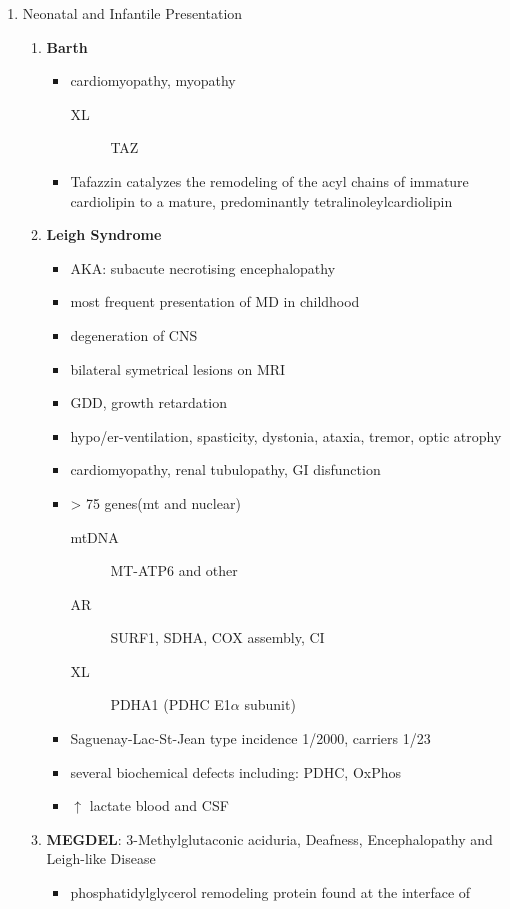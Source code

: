 \documentclass[12pt]{scrartcl}
\begin{document}
\begin{enumerate}
\item Neonatal and Infantile Presentation
\label{sec:orgbc77336}
\begin{enumerate}
\item \textbf{Barth}
\label{sec:org46046ce}
\begin{itemize}
\item cardiomyopathy, myopathy
\begin{description}
\item[{XL}] TAZ
\end{description}
\item Tafazzin catalyzes the remodeling of the acyl chains of immature
cardiolipin to a mature, predominantly tetralinoleylcardiolipin
\end{itemize}
\item \textbf{Leigh Syndrome}
\label{sec:org267f58e}
\begin{itemize}
\item AKA: subacute necrotising encephalopathy
\item most frequent presentation of MD in childhood
\item degeneration of CNS
\item bilateral symetrical lesions on MRI
\item GDD, growth retardation
\item hypo/er-ventilation, spasticity, dystonia, ataxia, tremor, optic atrophy
\item cardiomyopathy, renal tubulopathy, GI disfunction
\item \textgreater{} 75 genes(mt and nuclear)
\begin{description}
\item[{mtDNA}] MT-ATP6 and other
\item[{AR}] SURF1, SDHA, COX assembly, CI
\item[{XL}] PDHA1 (PDHC E1\(\alpha\) subunit)
\end{description}
\item Saguenay-Lac-St-Jean type incidence 1/2000, carriers 1/23
\item several biochemical defects including: PDHC, OxPhos
\item \(\uparrow\) lactate blood and CSF
\end{itemize}
\item \textbf{MEGDEL}: 3-Methylglutaconic aciduria, Deafness, Encephalopathy and Leigh-like Disease
\label{sec:org8e11212}
\begin{itemize}
\item phosphatidylglycerol remodeling protein found at the interface of

\end{itemize}
\end{enumerate}
\end{enumerate}
\end{document}
